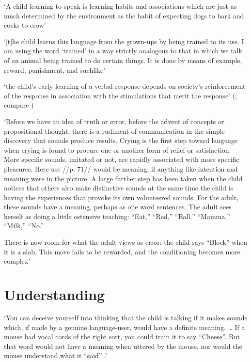 \documentclass[12pt]{extarticle}
\begin{document}
\begin{multicols}{3}
‘A child learning to speak is learning habits and associations which are just as much determined by the environment as the habit of expecting dogs to bark and cocks to crow’
\citep[p.\ 71]{Russell:1921ww}
 
‘[t]he child learns this language from the grown-ups by being trained to its use. I am using the word ‘trained’ in a way strictly analogous to that in which we talk of an animal being trained to do certain things. It is done by means of example, reward, punishment, and suchlike’
\citep[p.\ 77]{Wittgenstein:1972lj}
 
‘the child’s early learning of a verbal response depends on society's reinforcement of the response in association with the stimulations that merit the response’
(\citep[p.\ 82]{Quine:1960fe}; compare \citep[pp.\ 28--9]{Quine:1974rd})
 
‘Before we have an idea of truth or error, before the advent of concepts or propositional thought,
there is a rudiment of communication in the simple discovery that sounds produce results. Crying is the first step toward language when crying is found to procure one or another form of relief or satisfaction. More specific sounds, imitated or not, are rapidly associated with more specific pleasures.
Here use //p. 71// would be meaning, if anything like intention and meaning were in the picture.
A large further step has been taken when the child notices that others also make distinctive sounds at the same time the child is having the experiences that provoke its own volunteered sounds.
For the adult, these sounds have a meaning, perhaps as one word sentences. The adult sees herself as doing a little ostensive teaching: “Eat,” “Red,” “Ball,” “Mamma,” “Milk,” “No.”
 
There is now room for what the adult views as error: the child says “Block” when it is a slab. This move fails to be rewarded, and the conditioning becomes more complex’
\citep[pp.\ 70--1]{Davidson:2000mt}
 
 
 
\section{Understanding}
 
‘You can deceive yourself into thinking that the child is talking if it makes sounds which, if made by a genuine language-user, would have a definite meaning.
…  If a mouse had vocal cords of the right sort, you could train it to say “Cheese”. 
But that word would not have a meaning when uttered by the mouse,
nor would the mouse understand what it “said”
.’
\citep[p.\ 11]{Davidson:1999ju}
 

\end{multicols}
\end{document}
